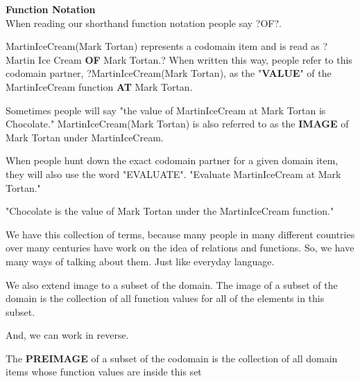 \documentclass{ximera}
\begin{document}
\begin{remark} \textbf{Function Notation} \\

When reading our shorthand function notation people say ?OF?.

MartinIceCream(Mark Tortan) represents a codomain item and is read as ?Martin Ice Cream \textbf{OF} Mark Tortan.? When written this way, people refer to this codomain partner,
?MartinIceCream(Mark Tortan), as the "\textbf{VALUE}" of the MartinIceCream function \textbf{AT} Mark Tortan.

Sometimes people will say "the value of MartinIceCream at Mark Tortan is Chocolate."
MartinIceCream(Mark Tortan) is also referred to as the \textbf{IMAGE} of Mark Tortan under MartinIceCream.

When people hunt down the exact codomain partner for a given domain item, they will also use the word "EVALUATE".
"Evaluate MartinIceCream at Mark Tortan."

"Chocolate is the value of Mark Tortan under the MartinIceCream function."

We have this collection of terms, because many people in many different countries over many centuries have work on the idea of relations and functions.  So, we have many ways of talking about them. Just like everyday language.

We also extend image to a subset of the domain.  The image of a subset of the domain is the collection of all function values for all of the elements in this subset.

And, we can work in reverse.

The \textbf{PREIMAGE} of a subset of the codomain is the collection of all domain items whose function values are inside this set


\end{remark}
\quad \\
\end{document}
